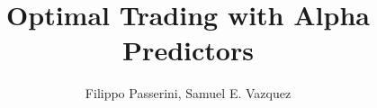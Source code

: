 \documentclass[11pt]{beamer}
\title[Optimal Trading with Alpha Predictors]{Optimal Trading with Alpha Predictors}
\author[F.Passerini, S.E.Vazquez]{Filippo Passerini, Samuel E. Vazquez}
\begin{document}
\begin{frame}
\titlepage 
\end{frame}


\end{document}
